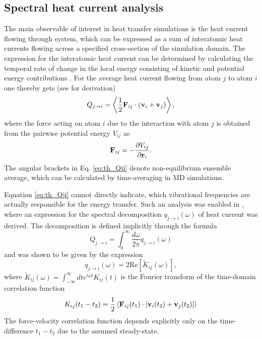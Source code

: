 \subsection{Spectral heat current analysis}
\label{sec:spectral}
The main observable of interest in heat transfer simulations is the heat current flowing through system, which can be expressed as a sum of interatomic heat currents flowing across a specified cross-section of the simulation domain. The expression for the interatomic heat current can be determined by calculating the temporal rate of change in the local energy consisting of kinetic and potential energy contributions \cite{hardy63,lepri03}. For the average heat current flowing from atom $j$ to atom $i$ one thereby gets (see  for derivation) 
\begin{equation}
 Q_{j\to i} = \left\langle \frac{1}{2} \mathbf{F}_{ij} \cdot \left( \mathbf{v}_i+\mathbf{v}_j \right) \right\rangle, \label{eq:th_Qji}
\end{equation}
where the force acting on atom $i$ due to the interaction with atom $j$ is obtained from the pairwise potential energy $V_{ij}$ as
\begin{equation}
 \mathbf{F}_{ij} = - \frac{\partial V_{ij}}{\partial \mathbf{r}_i}.
\end{equation}
The angular brackets in Eq. \eqref{eq:th_Qji} denote non-equilibrium ensemble average, which can be calculated by time-averaging in MD simulations. 

Equation \eqref{eq:th_Qji} cannot directly indicate, which vibrational frequencies are actually responsible for the energy transfer. Such an analysis was enabled in , where an expression for the spectral decomposition $q_{j\to i}(\omega)$ of heat current was derived. The decomposition is defined implicitly through the formula
\begin{equation}
 Q_{j\to i} = \int_0^{\infty} \frac{d\omega}{2\pi} q_{j\to i}(\omega)
\end{equation}
and was shown to be given by the expression
\begin{equation}
 q_{j \to i}(\omega) = 2\textrm{Re} [\tilde K_{ij}(\omega)],
\end{equation}
where $\tilde K_{ij}(\omega)=\int_{-\infty}^{\infty} dt e^{i\omega t}K_{ij}(t)$ is the Fourier transform of the time-domain correlation function
\begin{equation}
 K_{ij}(t_1-t_2) = \frac{1}{2} \left\langle \mathbf{F}_{ij}(t_1) \cdot \left[ \mathbf{v}_i(t_2)+\mathbf{v}_j(t_2)\right] \right\rangle \label{eq:th_Kijt1t2}
\end{equation}
The force-velocity correlation function depends explicitly only on the time-difference $t_1-t_2$ due to the assumed steady-state. 

